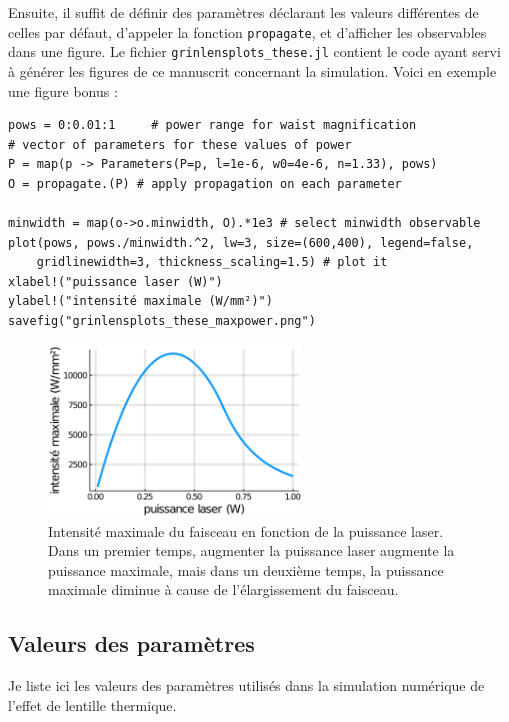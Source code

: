 Ensuite, il suffit de définir des paramètres déclarant les valeurs différentes de celles par défaut, d'appeler la fonction \verb|propagate|, et d'afficher les observables dans une figure. Le fichier \verb|grinlensplots_these.jl| contient le code ayant servi à générer les figures de ce manuscrit concernant la simulation. Voici en exemple une figure bonus :

\juliastyle
\begin{lstlisting}
pows = 0:0.01:1     # power range for waist magnification
# vector of parameters for these values of power
P = map(p -> Parameters(P=p, l=1e-6, w0=4e-6, n=1.33), pows)
O = propagate.(P) # apply propagation on each parameter

minwidth = map(o->o.minwidth, O).*1e3 # select minwidth observable
plot(pows, pows./minwidth.^2, lw=3, size=(600,400), legend=false,
    gridlinewidth=3, thickness_scaling=1.5) # plot it
xlabel!("puissance laser (W)")
ylabel!("intensité maximale (W/mm²)")
savefig("grinlensplots_these_maxpower.png")
\end{lstlisting}

\begin{figure}
    \centering
    \includegraphics[width=0.6\textwidth]{./files/grinlensplots_these_maxpower.png}
    \caption{Intensité maximale du faisceau en fonction de la puissance laser. Dans un premier temps, augmenter la puissance laser augmente la puissance maximale, mais dans un deuxième temps, la puissance maximale diminue à cause de l'élargissement du faisceau.
    \label{AppFIGmaxintensity}}
    \end{figure}

\subsection{Valeurs des paramètres}

Je liste ici les valeurs des paramètres utilisés dans la simulation numérique de l'effet de lentille thermique.

